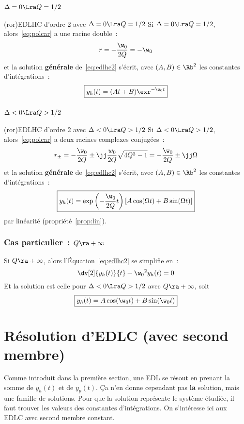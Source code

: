 \documentclass[a4paper, 12pt, garamond]{book}
\begin{document}
\subsubsection{$\Delta = 0 \Lra Q=1/2$}
\begin{tcb}(ror){EDLHC d'ordre 2 avec $\Delta = 0 \Lra Q=1/2$}
	Si $\Delta = 0 \Lra Q = 1/2$, alors~\eqref{eq:polcar} a une racine double~:
	\[
		r = -\frac{\w_0}{2Q} = -\w_0
	\]
	et la solution \textbf{générale} de~\eqref{eq:edlhc2} s'écrit, avec $(A,B) \in
		\Rb^{2}$ les constantes d'intégrations~:
	\[
		\boxed{y_h(t) = (At + B)\exr^{-\w_0t}}
	\]
\end{tcb}

\subsubsection{$\Delta < 0 \Lra Q>1/2$}
\begin{tcb}(ror){EDLHC d'ordre 2 avec $\Delta < 0 \Lra Q>1/2$}
	Si $\Delta < 0 \Lra Q > 1/2$, alors~\eqref{eq:polcar} a deux racines complexes
	conjugées~:
	\[
		r_{\pm} =
		-\frac{\w_0}{2Q} \pm \jj \frac{w_0}{2Q} \sqrt{4Q^{2}-1} =
		-\frac{\w_0}{2Q} \pm \jj \Omega
	\]
	et la solution \textbf{générale} de~\eqref{eq:edlhc2} s'écrit, avec $(A,B) \in
		\Rb^{2}$ les constantes d'intégrations~:
	\[
		\boxed{
			y_h(t) = \exp\left( -\frac{\w_0}{2Q}t \right)
			\left[A\cos(\Omega t) + B\sin(\Omega t)\right]
		}
	\]
	par linéarité (propriété~\ref{prop:lin}).
\end{tcb}

\subsubsection{Cas particulier~: $Q \ra +\infty$}
Si $Q \ra +\infty$, alors l'Équation~\eqref{eq:edlhc2} se simplifie en~:
\[
	\dv[2]{y_h(t)}{t} + \w_0{}^{2}y_h(t) = 0
\]
Et la solution est celle pour $\Delta < 0 \Lra Q>1/2$ avec $Q \ra +\infty$, soit
\[
	\boxed{y_h(t) = A \cos(\w_0t) + B\sin(\w_0t)}
\]

\section{Résolution d'EDLC (avec second membre)}
Comme introduit dans la première section, une EDL se résout en prenant la somme
de $y_h(t)$ et de $y_p(t)$. Ça n'en donne cependant pas \textbf{la} solution,
mais une famille de solutions. Pour que la solution représente le système
étudiée, il faut trouver les valeurs des constantes d'intégrations. On
s'intéresse ici aux EDLC avec second membre constant.
\end{document}
